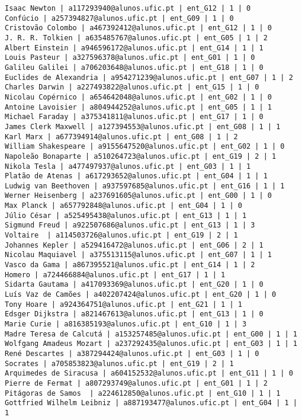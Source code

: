 \documentclass[11pt,a4paper]{report}%
\begin{document}
\begin{verbatim}
Isaac Newton | a117293940@alunos.ufic.pt | ent_G12 | 1 | 0
Confúcio | a257394827@alunos.ufic.pt | ent_G09 | 1 | 0
Cristovão Colombo | a467392412@alunos.ufic.pt | ent_G12 | 1 | 0
J. R. R. Tolkien | a635485767@alunos.ufic.pt | ent_G05 | 1 | 2
Albert Einstein | a946596172@alunos.ufic.pt | ent_G14 | 1 | 1
Louis Pasteur | a327596378@alunos.ufic.pt | ent_G01 | 1 | 0
Galileu Galilei | a706203648@alunos.ufic.pt | ent_G18 | 1 | 0
Euclides de Alexandria | a954271239@alunos.ufic.pt | ent_G07 | 1 | 2
Charles Darwin | a227493822@alunos.ufic.pt | ent_G15 | 1 | 0
Nicolau Copérnico | a654642048@alunos.ufic.pt | ent_G02 | 1 | 0
Antoine Lavoisier | a804944252@alunos.ufic.pt | ent_G05 | 1 | 1
Michael Faraday | a375341811@alunos.ufic.pt | ent_G17 | 1 | 0
James Clerk Maxwell | a127394553@alunos.ufic.pt | ent_G08 | 1 | 1
Karl Marx | a677394914@alunos.ufic.pt | ent_G08 | 1 | 2
William Shakespeare | a9155647520@alunos.ufic.pt | ent_G02 | 1 | 0
Napoleão Bonaparte | a510264723@alunos.ufic.pt | ent_G19 | 2 | 1
Nikola Tesla | a477497937@alunos.ufic.pt | ent_G03 | 1 | 1
Platão de Atenas | a617293652@alunos.ufic.pt | ent_G04 | 1 | 1
Ludwig van Beethoven | a937597685@alunos.ufic.pt | ent_G16 | 1 | 1
Werner Heisenberg | a237691605@alunos.ufic.pt | ent_G00 | 1 | 0
Max Planck | a657792848@alunos.ufic.pt | ent_G04 | 1 | 0
Júlio César | a525495438@alunos.ufic.pt | ent_G13 | 1 | 1
Sigmund Freud | a922507686@alunos.ufic.pt | ent_G13 | 1 | 3
Voltaire  | a114503726@alunos.ufic.pt | ent_G19 | 2 | 1
Johannes Kepler | a529416472@alunos.ufic.pt | ent_G06 | 2 | 1
Nicolau Maquiavel | a375513115@alunos.ufic.pt | ent_G07 | 1 | 1
Vasco da Gama | a867395521@alunos.ufic.pt | ent_G14 | 1 | 2
Homero | a724466884@alunos.ufic.pt | ent_G17 | 1 | 1
Sidarta Gautama | a417093369@alunos.ufic.pt | ent_G20 | 1 | 0
Luís Vaz de Camões | a402207424@alunos.ufic.pt | ent_G20 | 1 | 0
Tony Hoare | a924364751@alunos.ufic.pt | ent_G21 | 1 | 1
Edsger Dijkstra | a821467613@alunos.ufic.pt | ent_G13 | 1 | 0
Marie Curie | a816385193@alunos.ufic.pt | ent_G10 | 1 | 3
Madre Teresa de Calcutá | a153257485@alunos.ufic.pt | ent_G00 | 1 | 1
Wolfgang Amadeus Mozart | a237292435@alunos.ufic.pt | ent_G03 | 1 | 1
René Descartes | a387294424@alunos.ufic.pt | ent_G03 | 1 | 0
Socrates | a705853823@alunos.ufic.pt | ent_G19 | 2 | 1
Arquimedes de Siracusa | a604152532@alunos.ufic.pt | ent_G11 | 1 | 0
Pierre de Fermat | a807293749@alunos.ufic.pt | ent_G01 | 1 | 2
Pitágoras de Samos  | a224612850@alunos.ufic.pt | ent_G10 | 1 | 1
Gottfried Wilhelm Leibniz | a887193477@alunos.ufic.pt | ent_G04 | 1 | 1

\end{verbatim}
\end{document}
